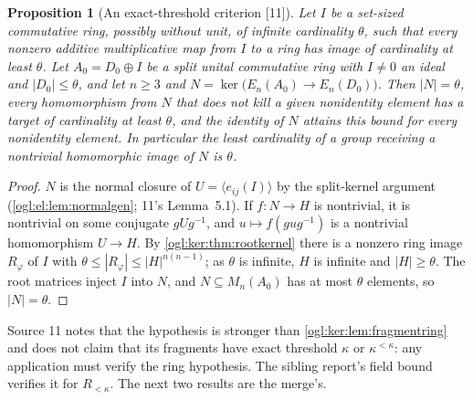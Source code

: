 \documentclass[11pt,oneside]{article}
\numberwithin{equation}{section}
\newtheorem{proposition}[proposition]{Proposition}
\theoremstyle{definition}
\theoremstyle{remark}
\newcommand{\src}[1]{\textup{\textsf{\small[#1]}}}
\begin{document}
\begin{proposition}[An exact-threshold criterion \src{11}]\label{ogl:ker:prop:exactthreshold}
Let $I$ be a set-sized commutative ring, possibly without unit, of infinite
cardinality $\theta$, such that every nonzero additive multiplicative map from
$I$ to a ring has image of cardinality at least $\theta$. Let $A_0=D_0\oplus I$
be a split unital commutative ring with $I\ne0$ an ideal and $|D_0|\le\theta$,
and let $n\ge3$ and $N=\ker\bigl(E_n(A_0)\to E_n(D_0)\bigr)$. Then
$|N|=\theta$, every homomorphism from $N$ that does not kill a given
nonidentity element has a target of cardinality at least $\theta$, and the
identity of $N$ attains this bound for every nonidentity element. In particular
the least cardinality of a group receiving a nontrivial homomorphic image of $N$
is $\theta$.
\end{proposition}
\begin{proof}
$N$ is the normal closure of $U=\langle e_{ij}(I)\rangle$ by the split-kernel
argument (\cref{ogl:el:lem:normalgen}; 11's Lemma~5.1). If $f:N\to H$ is
nontrivial, it is nontrivial on some conjugate $gUg^{-1}$, and
$u\mapsto f(gug^{-1})$ is a nontrivial homomorphism $U\to H$. By
\cref{ogl:ker:thm:rootkernel} there is a nonzero ring image $R_\varphi$ of $I$ with
$\theta\le|R_\varphi|\le|H|^{n(n-1)}$; as $\theta$ is infinite, $H$ is infinite and
$|H|\ge\theta$. The root matrices inject $I$ into $N$, and $N\subseteq M_n(A_0)$
has at most $\theta$ elements, so $|N|=\theta$.
\end{proof}

Source 11 notes that the hypothesis is stronger than
\cref{ogl:ker:lem:fragmentring} and does not claim that its fragments have exact
threshold $\kappa$ or $\kappa^{<\kappa}$: any application must verify the ring
hypothesis. The sibling report's field bound verifies it for $R_{<\kappa}$. The
next two results are the merge's.
\end{document}
